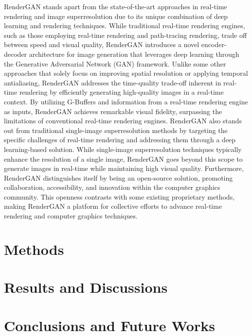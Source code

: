 RenderGAN stands apart from the state-of-the-art approaches in real-time rendering and image superresolution due to its unique combination of deep learning and rendering techniques. While traditional real-time rendering engines, such as those employing real-time rendering and path-tracing rendering, trade off between speed and visual quality, RenderGAN introduces a novel encoder-decoder architecture for image generation that leverages deep learning through the Generative Adversarial Network (GAN) framework. Unlike some other approaches that solely focus on improving spatial resolution or applying temporal antialiasing, RenderGAN addresses the time-quality trade-off inherent in real-time rendering by efficiently generating high-quality images in a real-time context. By utilizing G-Buffers and information from a real-time rendering engine as inputs, RenderGAN achieves remarkable visual fidelity, surpassing the limitations of conventional real-time rendering engines. RenderGAN also stands out from traditional single-image superresolution methods by targeting the specific challenges of real-time rendering and addressing them through a deep learning-based solution. While single-image superresolution techniques typically enhance the resolution of a single image, RenderGAN goes beyond this scope to generate images in real-time while maintaining high visual quality. Furthermore, RenderGAN distinguishes itself by being an open-source solution, promoting collaboration, accessibility, and innovation within the computer graphics community. This openness contrasts with some existing proprietary methods, making RenderGAN a platform for collective efforts to advance real-time rendering and computer graphics techniques.

\section{Methods}
\label{sec:methods}


\section{Results and Discussions}
\label{sec:rendering_results}


\section{Conclusions and Future Works}
\label{sec:conclusion}


\begin{acks}


\end{acks}


